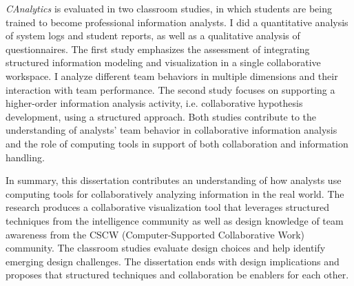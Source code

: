 \textit{CAnalytics} is evaluated in two classroom studies, in which students are being trained to become professional information analysts. I did a quantitative analysis of system logs and student reports, as well as a qualitative analysis of questionnaires. The first study emphasizes the assessment of integrating structured information modeling and visualization in a single collaborative workspace. I analyze different team behaviors in multiple dimensions and their interaction with team performance. The second study focuses on supporting a higher-order information analysis activity, i.e. collaborative hypothesis development, using a structured approach. Both studies contribute to the understanding of analysts' team behavior in collaborative information analysis and the role of computing tools in support of both collaboration and information handling.

In summary, this dissertation contributes an understanding of how analysts use computing tools for collaboratively analyzing information in the real world. The research produces a collaborative visualization tool that leverages structured techniques from the intelligence community as well as design knowledge of team awareness from the CSCW (Computer-Supported Collaborative Work) community. The classroom studies evaluate design choices and help identify emerging design challenges. The dissertation ends with design implications and proposes that structured techniques and collaboration be enablers for each other.